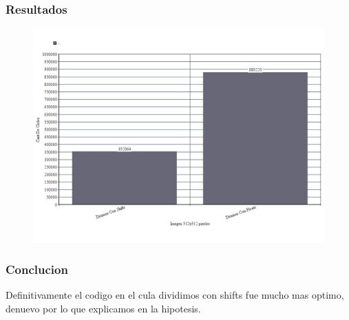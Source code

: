 \subsubsection{Resultados}
	\begin{figure}[!h]
	\includegraphics[width = 15 cm, height = 10 cm]{imagenes/Div_pixelar.jpg}
	\end{figure}
	
\subsubsection{Conclucion}
	Definitivamente el codigo en el cula dividimos con shifts fue mucho mas optimo, denuevo por lo que explicamos en la hipotesis.
